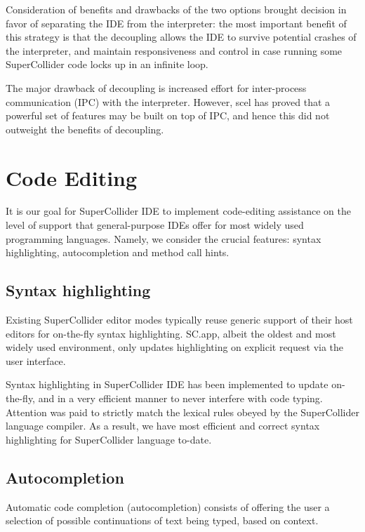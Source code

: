 \documentclass[11pt,a4paper]{article}
\begin{document}
Consideration of benefits and drawbacks of the two options brought decision in favor of
separating the IDE from the interpreter: the most important benefit of this strategy is that the
decoupling allows the IDE to survive potential crashes of the interpreter, and maintain
responsiveness and control in case running some SuperCollider code locks up in an infinite loop.

The major drawback of decoupling is increased effort for inter-process communication (IPC) with the
interpreter. However, scel has proved that a powerful set of features may be built on top of IPC,
and hence this did not outweight the benefits of decoupling.

\section{Code Editing}

It is our goal for SuperCollider IDE to implement code-editing assistance on the level of support
that general-purpose IDEs offer for most widely used programming languages. Namely,
we consider the crucial features: syntax highlighting, autocompletion and method call hints.

\subsection{Syntax highlighting}

Existing SuperCollider editor modes typically reuse generic support of their host editors for
on-the-fly syntax highlighting. SC.app, albeit the oldest and most widely used environment, only
updates highlighting on explicit request via the user interface.

Syntax highlighting in SuperCollider IDE has been implemented to update on-the-fly, and in a very
efficient manner to never interfere with code typing. Attention was paid to strictly match the
lexical rules obeyed by the SuperCollider language compiler. As a result, we have most efficient and
correct syntax highlighting for SuperCollider language to-date.

\subsection{Autocompletion}

Automatic code completion (autocompletion) consists of offering the user a selection of possible
continuations of text being typed, based on context.
\end{document}
